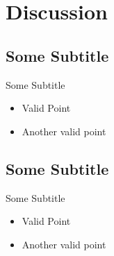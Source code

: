 \section{Discussion}
\subsection{Some Subtitle}
\begin{frame}{Some Subtitle}
\begin{center}
\begin{itemize}
    \item Valid Point
    \item Another valid point
\end{itemize}
\end{center}
\end{frame}
%
%
\subsection{Some Subtitle}
\begin{frame}{Some Subtitle}
\begin{center}
    \begin{itemize}
        \item Valid Point
        \item Another valid point
    \end{itemize}
\end{center}
\end{frame}
%
